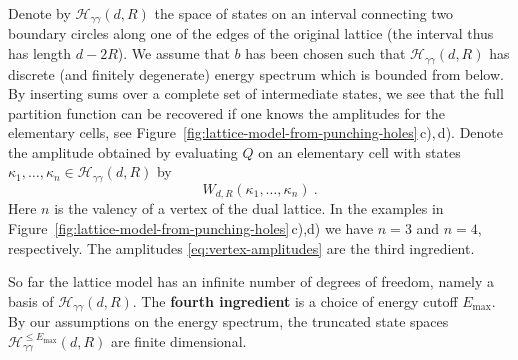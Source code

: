 \documentclass[11pt,a4paper]{article}
\numberwithin{equation}{section}
\begin{document}
Denote by $\mathcal{H}_{\gamma\gamma}(d,R)$ the space of states on an interval connecting two boundary circles along one of the edges of the original lattice (the interval thus has length $d-2R$). 
We assume that $b$ has been chosen such that $\mathcal{H}_{\gamma\gamma}(d,R)$ has discrete (and finitely degenerate) energy spectrum which is bounded from below.
By inserting sums over a complete set of intermediate states, we see that the full partition function can be recovered if one knows the amplitudes for the elementary cells, see Figure~\ref{fig:lattice-model-from-punching-holes}\,c),\,d). 
Denote the amplitude obtained by evaluating $Q$ on an elementary cell with states $\kappa_1,\dots,\kappa_n \in \mathcal{H}_{\gamma\gamma}(d,R)$ by
\begin{equation}\label{eq:vertex-amplitudes}
    W_{d,R}(\kappa_1,\dots,\kappa_n)  ~.
\end{equation}
Here $n$ is the valency of a vertex of the dual lattice. In the examples in Figure~\ref{fig:lattice-model-from-punching-holes}\,c),d) we have $n=3$ and $n=4$, respectively.
The amplitudes \eqref{eq:vertex-amplitudes} are the third ingredient.

\medskip

So far the lattice model has an infinite number of degrees of freedom, namely a basis of $\mathcal{H}_{\gamma\gamma}(d,R)$. The \textbf{fourth ingredient} is a choice of energy cutoff $E_\mathrm{max}$.
By our assumptions on the energy spectrum, the truncated state spaces $\mathcal{H}_{\gamma\gamma}^{\le E_{\mathrm{max}}}(d,R)$ are finite dimensional.

\medskip
\end{document}
